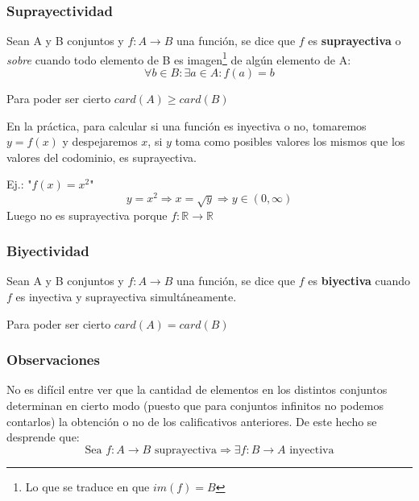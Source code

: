 \documentclass[10pt,a4paper,openright]{book}
\begin{document}
\subsubsection*{Suprayectividad}
Sean A y B conjuntos y $f: A \rightarrow B$ una función, se dice que $f$ es \textbf{suprayectiva} o \textit{sobre} cuando todo elemento de B es imagen\footnote{Lo que se traduce en que $im(f)=B$} de algún elemento de A:
$$\forall b \in B : \exists a \in A : f(a)=b$$

Para poder ser cierto $card(A)\geq card(B)$\par

En la práctica, para calcular si una función es inyectiva o no, tomaremos $y=f(x)$ y despejaremos $x$, si $y$ toma como posibles valores los mismos que los valores del codominio, es suprayectiva.\par

Ej.:  "$f(x)=x^2$"
$$y=x^2\Rightarrow x=\sqrt{y}\Rightarrow y\in (0,\infty)$$
Luego no es suprayectiva porque $f: \mathbb R \rightarrow \mathbb R$

\subsubsection*{Biyectividad}
Sean A y B conjuntos y $f: A \rightarrow B$ una función, se dice que $f$ es \textbf{biyectiva} cuando $f$ es inyectiva y suprayectiva simultáneamente.\par
Para poder ser cierto $card(A) = card(B)$

\subsubsection*{Observaciones}
No es difícil entre ver que la cantidad de elementos en los distintos conjuntos determinan en cierto modo (puesto que  para conjuntos infinitos no podemos contarlos) la obtención o no de los calificativos anteriores. De este hecho se desprende que:
$$\mbox{Sea }f: A\rightarrow B\mbox{ suprayectiva}\Rightarrow \exists f: B\rightarrow A \mbox{ inyectiva} $$
\end{document}
